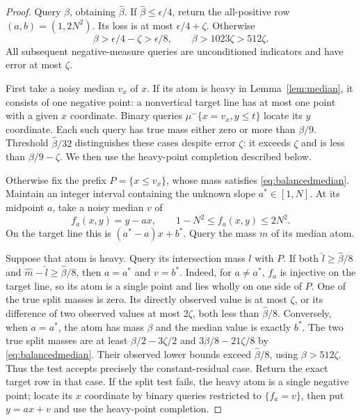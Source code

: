 \begin{proof}
Query $\beta$, obtaining $\widehat\beta$. If $\widehat\beta\le\epsilon/4$, return the all-positive row $(a,b)=(1,2N^2)$. Its loss is at most $\epsilon/4+\zeta$. Otherwise
\[
 \beta>\epsilon/4-\zeta>\epsilon/8,
 \qquad \beta>1023\zeta>512\zeta.
\]
All subsequent negative-measure queries are unconditioned indicators and have error at most $\zeta$.

First take a noisy median $v_x$ of $x$. If its atom is heavy in Lemma~\ref{lem:median}, it consists of one negative point: a nonvertical target line has at most one point with a given $x$ coordinate. Binary queries $\mu^-\{x=v_x,y\le t\}$ locate its $y$ coordinate. Each such query has true mass either zero or more than $\beta/9$. Threshold $\widehat\beta/32$ distinguishes these cases despite error $\zeta$: it exceeds $\zeta$ and is less than $\beta/9-\zeta$. We then use the heavy-point completion described below.

Otherwise fix the prefix $P=\{x\le v_x\}$, whose mass satisfies \eqref{eq:balancedmedian}. Maintain an integer interval containing the unknown slope $a^*\in[1,N]$. At its midpoint $a$, take a noisy median $v$ of
\[
 f_a(x,y)=y-ax,
 \qquad 1-N^2\le f_a(x,y)\le2N^2.
\]
On the target line this is $(a^*-a)x+b^*$. Query the mass $m$ of its median atom.

Suppose that atom is heavy. Query its intersection mass $l$ with $P$. If both $\widehat l\ge\widehat\beta/8$ and $\widehat m-\widehat l\ge\widehat\beta/8$, then $a=a^*$ and $v=b^*$. Indeed, for $a\ne a^*$, $f_a$ is injective on the target line, so its atom is a single point and lies wholly on one side of $P$. One of the true split masses is zero. Its directly observed value is at most $\zeta$, or its difference of two observed values at most $2\zeta$, both less than $\widehat\beta/8$. Conversely, when $a=a^*$, the atom has mass $\beta$ and the median value is exactly $b^*$. The two true split masses are at least $\beta/2-3\zeta/2$ and $3\beta/8-21\zeta/8$ by \eqref{eq:balancedmedian}. Their observed lower bounds exceed $\widehat\beta/8$, using $\beta>512\zeta$. Thus the test accepts precisely the constant-residual case. Return the exact target row in that case. If the split test fails, the heavy atom is a single negative point; locate its $x$ coordinate by binary queries restricted to $\{f_a=v\}$, then put $y=ax+v$ and use the heavy-point completion.


\end{proof}
